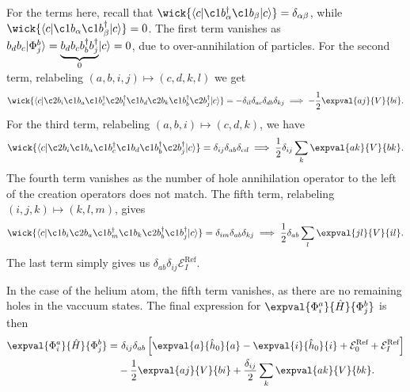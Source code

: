 For the terms here, recall that $\wick{\langle c \vert \c1 b_\alpha^\dagger \c1 b_\beta \vert c \rangle} = \delta_{\alpha \beta}$, while $\wick{\langle c \vert \c1 b_\alpha \c1 b_\beta^\dagger \vert c \rangle} = 0$.
The first term vanishes as $b_d b_c\lvert\Phi_j^{b}\rangle =  \underbrace{b_d b_c b_b^\dagger b_j^\dagger}_{0}\lvert c\rangle= 0$, due to over-annihilation of particles.
For the second term, relabeling $(a, b, i, j) \mapsto (c, d, k, l)$ we get
\begin{equation*}
    \wick{
        \langle
        c \vert
        \c2 b_i
        \c1 b_a
        \c1 b_c^\dagger
        \c2 b_l^\dagger
        \c1 b_d
        \c2 b_k
        \c1 b_b^\dagger
        \c2 b_j^\dagger
        \vert c
        \rangle
    } = -\delta_{il} \delta_{ac} \delta_{db} \delta_{kj} \implies
    -\frac{1}{2} \expval{a j}{V}{b i}.
\end{equation*}
For the third term, relabeling $(a, b, i) \mapsto (c, d, k)$, we have
\begin{equation*}
    \wick{
        \langle
        c \vert
        \c2 b_i
        \c1 b_a
        \c1 b_c^\dagger
        \c1 b_d
        \c1 b_b^\dagger
        \c2 b_j^\dagger
        \vert c
        \rangle
    } = \delta_{ij} \delta_{ab} \delta_{cd} \implies
    \frac{1}{2} \delta_{ij} \sum_{k} \expval{a k}{V}{b k}.
\end{equation*}
The fourth term vanishes as the number of hole annihilation operator to the left of the creation operators does not match.
The fifth term, relabeling $(i, j, k) \mapsto (k, l, m)$, gives
\begin{equation*}
    \wick{
        \langle
        c \vert
        \c1 b_i
        \c2 b_a
        \c1 b_m^\dagger
        \c1 b_k
        \c2 b_b^\dagger
        \c1 b_j^\dagger
        \vert c
        \rangle
    } = \delta_{im} \delta_{ab} \delta_{kj} \implies
    \frac{1}{2} \delta_{ab} \sum_{l} \expval{j l}{V}{i l}.
\end{equation*}
The last term simply gives us $\delta_{ab} \delta_{ij} \mathcal{E}_I^{\text{Ref}}$.

In the case of the helium atom, the fifth term vanishes, as there are no remaining holes in the vaccuum states. %
The final expression for $\expval{\Phi_i^a}{\hat{H}}{\Phi_j^b}$ is then
\begin{equation}\label{eq:1p1h-1p1h}
    \begin{split}
        \expval{\Phi_i^a}{\hat{H}}{\Phi_j^b}
        =& \ \delta_{ij} \delta_{ab} \left[
            \expval{a}{\hat{h}_0}{a}
            - \expval{i}{\hat{h}_0}{i}
            + \mathcal{E}_0^{\text{Ref}}
            + \mathcal{E}_I^{\text{Ref}}
        \right] \\
        &- \frac{1}{2} \expval{a j}{V}{b i}
        + \frac{\delta_{ij}}{2} \sum_{k} \expval{a k}{V}{b k}.
    \end{split}
\end{equation}

